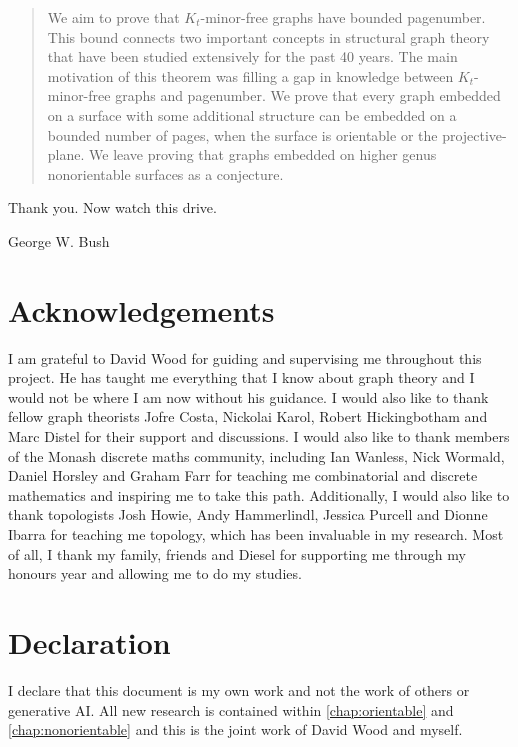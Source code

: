 \begin{abstract}
	We aim to prove that \(K_t\)-minor-free graphs have bounded pagenumber. This bound connects two important concepts in structural graph theory that have been studied extensively for the past 40 years. The main motivation of this theorem was filling a gap in knowledge between $K_t$-minor-free graphs and pagenumber. We prove that every graph embedded on a surface with some additional structure can be embedded on a bounded number of pages, when the surface is orientable or the projective-plane. We leave proving that graphs embedded on higher genus nonorientable surfaces as a conjecture. 
\end{abstract}

\epigraph{Thank you. Now watch this drive.}{George W. Bush}
\newpage

\section{Acknowledgements}
I am grateful to David Wood for guiding and supervising me throughout this project. He has taught me everything that I know about graph theory and I would not be where I am now without his guidance. I would also like to thank fellow graph theorists Jofre Costa, Nickolai Karol, Robert Hickingbotham and Marc Distel for their support and discussions. I would also like to thank members of the Monash discrete maths community, including Ian Wanless, Nick Wormald, Daniel Horsley and Graham Farr for teaching me combinatorial and discrete mathematics and inspiring me to take this path. Additionally, I would also like to thank topologists Josh Howie, Andy Hammerlindl, Jessica Purcell and Dionne Ibarra for teaching me topology, which has been invaluable in my research. Most of all, I thank my family, friends and Diesel for supporting me through my honours year and allowing me to do my studies.

\section{Declaration}

I declare that this document is my own work and not the work of others or generative AI. All new research is contained within \cref{chap:orientable} and \cref{chap:nonorientable} and this is the joint work of David Wood and myself.

